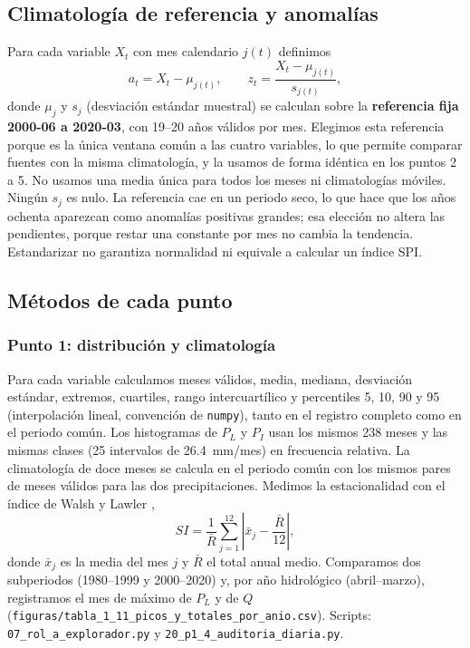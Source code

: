 \documentclass[11pt,a4paper]{article}
\newcommand{\archivo}[1]{\nolinkurl{#1}}
\newcommand{\PL}{P_L}
\newcommand{\PI}{P_I}
\newcommand{\Qm}{Q}
\begin{document}
\subsection{Climatología de referencia y anomalías}
\label{sec:anomalias}

Para cada variable $X_t$ con mes calendario $j(t)$ definimos
\begin{equation}
a_t = X_t-\mu_{j(t)},\qquad z_t=\frac{X_t-\mu_{j(t)}}{s_{j(t)}},
\label{eq:anomalias}
\end{equation}
donde $\mu_j$ y $s_j$ (desviación estándar muestral) se calculan sobre la \textbf{referencia fija 2000-06 a 2020-03}, con 19--20 años válidos por mes. Elegimos esta referencia porque es la única ventana común a las cuatro variables, lo que permite comparar fuentes con la misma climatología, y la usamos de forma idéntica en los puntos 2 a 5. No usamos una media única para todos los meses ni climatologías móviles. Ningún $s_j$ es nulo. La referencia cae en un periodo seco, lo que hace que los años ochenta aparezcan como anomalías positivas grandes; esa elección no altera las pendientes, porque restar una constante por mes no cambia la tendencia. Estandarizar no garantiza normalidad ni equivale a calcular un índice SPI.

\subsection{Métodos de cada punto}

\subsubsection{Punto 1: distribución y climatología}
Para cada variable calculamos meses válidos, media, mediana, desviación estándar, extremos, cuartiles, rango intercuartílico y percentiles 5, 10, 90 y 95 (interpolación lineal, convención de \texttt{numpy}), tanto en el registro completo como en el periodo común. Los histogramas de $\PL$ y $\PI$ usan los mismos 238 meses y las mismas clases (25 intervalos de 26.4~mm/mes) en frecuencia relativa. La climatología de doce meses se calcula en el periodo común con los mismos pares de meses válidos para las dos precipitaciones. Medimos la estacionalidad con el índice de Walsh y Lawler \citep{WalshLawler1981},
\begin{equation}
SI=\frac{1}{\bar R}\sum_{j=1}^{12}\left|\bar x_j-\frac{\bar R}{12}\right|,
\end{equation}
donde $\bar x_j$ es la media del mes $j$ y $\bar R$ el total anual medio. Comparamos dos subperiodos (1980--1999 y 2000--2020) y, por año hidrológico (abril--marzo), registramos el mes de máximo de $\PL$ y de $\Qm$ (\archivo{figuras/tabla_1_11_picos_y_totales_por_anio.csv}). Scripts: \archivo{07_rol_a_explorador.py} y \archivo{20_p1_4_auditoria_diaria.py}.
\end{document}
